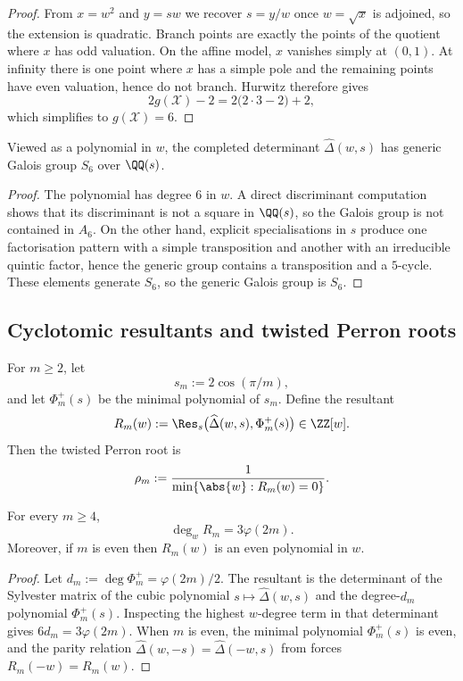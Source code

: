 \begin{proof}
  From $x=w^2$ and $y=sw$ we recover $s=y/w$ once $w=\sqrt{x}$ is
  adjoined, so the extension is quadratic. Branch points are exactly
  the points of the quotient where $x$ has odd valuation. On the affine
  model, $x$ vanishes simply at $(0,1)$. At infinity there is one point
  where $x$ has a simple pole and the remaining points have even
  valuation, hence do not branch. Hurwitz therefore gives
  \[
    2g(\mathcal X)-2
    =2\bigl(2\cdot 3-2\bigr)+2,
  \]
  which simplifies to $g(\mathcal X)=6$.
\end{proof}

\begin{proposition}
  \label{prop:sync-hatdelta-galois-s6-generic}
  Viewed as a polynomial in $w$, the completed determinant
  $\widehat\Delta(w,s)$ has generic Galois group $S_6$ over $\QQ(s)$.
\end{proposition}

\begin{proof}
  The polynomial has degree $6$ in $w$. A direct discriminant
  computation shows that its discriminant is not a square in $\QQ(s)$,
  so the Galois group is not contained in $A_6$. On the other hand,
  explicit specialisations in $s$ produce one factorisation pattern with
  a simple transposition and another with an irreducible quintic factor,
  hence the generic group contains a transposition and a $5$-cycle.
  These elements generate $S_6$, so the generic Galois group is $S_6$.
\end{proof}

\subsection{Cyclotomic resultants and twisted Perron roots}

For $m\ge 2$, let
\[
  s_m:=2\cos(\pi/m),
\]
and let $\Phi_m^+(s)$ be the minimal polynomial of $s_m$. Define the
resultant
\[
  R_m(w):=\Res_s\bigl(\widehat\Delta(w,s),\Phi_m^+(s)\bigr)\in\ZZ[w].
\]
Then the twisted Perron root is
\[
  \rho_m:=\frac{1}{\min\{\abs{w}:R_m(w)=0\}}.
\]

\begin{theorem}
  \label{thm:sync-cyclotomic-degree-law}
  For every $m\ge 4$,
  \[
    \deg_w R_m=3\varphi(2m).
  \]
  Moreover, if $m$ is even then $R_m(w)$ is an even polynomial in $w$.
\end{theorem}

\begin{proof}
  Let $d_m:=\deg \Phi_m^+=\varphi(2m)/2$. The resultant is the
  determinant of the Sylvester matrix of the cubic polynomial
  $s\mapsto\widehat\Delta(w,s)$ and the degree-$d_m$ polynomial
  $\Phi_m^+(s)$. Inspecting the highest $w$-degree term in that
  determinant gives $6d_m=3\varphi(2m)$. When $m$ is even, the minimal
  polynomial $\Phi_m^+(s)$ is even, and the parity relation
  $\widehat\Delta(w,-s)=\widehat\Delta(-w,s)$ from
   forces $R_m(-w)=R_m(w)$.
\end{proof}

